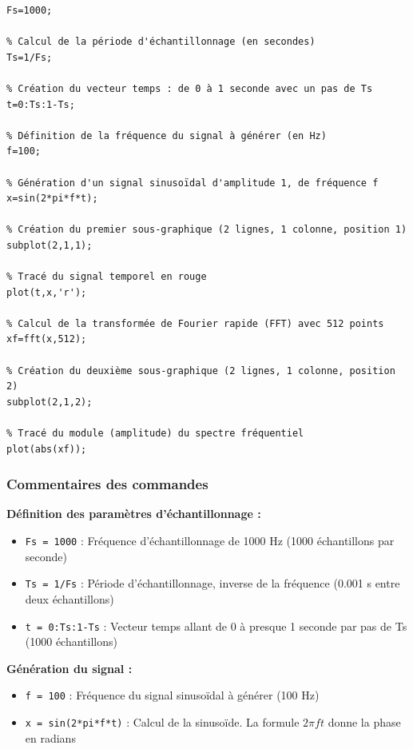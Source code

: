 \documentclass[12pt,a4paper]{article}
\begin{document}
\begin{lstlisting}[caption=Génération d'un signal sinusoïdal et calcul de sa FFT]
% Définition de la fréquence d'échantillonnage (en Hz)
Fs=1000;

% Calcul de la période d'échantillonnage (en secondes)
Ts=1/Fs;

% Création du vecteur temps : de 0 à 1 seconde avec un pas de Ts
t=0:Ts:1-Ts;

% Définition de la fréquence du signal à générer (en Hz)
f=100;

% Génération d'un signal sinusoïdal d'amplitude 1, de fréquence f
x=sin(2*pi*f*t);

% Création du premier sous-graphique (2 lignes, 1 colonne, position 1)
subplot(2,1,1);

% Tracé du signal temporel en rouge
plot(t,x,'r');

% Calcul de la transformée de Fourier rapide (FFT) avec 512 points
xf=fft(x,512);

% Création du deuxième sous-graphique (2 lignes, 1 colonne, position 2)
subplot(2,1,2);

% Tracé du module (amplitude) du spectre fréquentiel
plot(abs(xf));
\end{lstlisting}

\subsubsection{Commentaires des commandes}

\textbf{Définition des paramètres d'échantillonnage :}
\begin{itemize}
    \item \texttt{Fs = 1000} : Fréquence d'échantillonnage de 1000 Hz (1000 échantillons par seconde)
    \item \texttt{Ts = 1/Fs} : Période d'échantillonnage, inverse de la fréquence (0.001 s entre deux échantillons)
    \item \texttt{t = 0:Ts:1-Ts} : Vecteur temps allant de 0 à presque 1 seconde par pas de Ts (1000 échantillons)
\end{itemize}

\textbf{Génération du signal :}
\begin{itemize}
    \item \texttt{f = 100} : Fréquence du signal sinusoïdal à générer (100 Hz)
    \item \texttt{x = sin(2*pi*f*t)} : Calcul de la sinusoïde. La formule $2\pi f t$ donne la phase en radians
\end{itemize}
\end{document}
